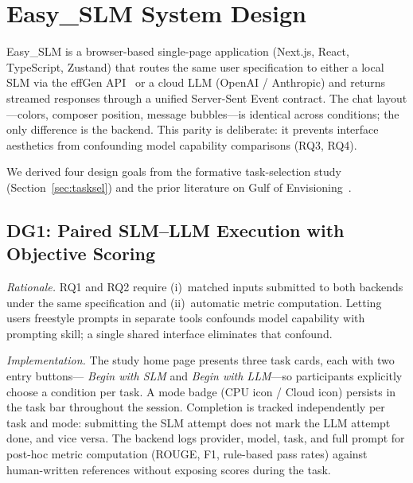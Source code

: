 \section{Easy\_SLM System Design}

Easy\_SLM is a browser-based single-page application (Next.js, React,
TypeScript, Zustand) that routes the same user specification to either a local
SLM via the effGen API~\cite{effgen} or a cloud LLM (OpenAI / Anthropic) and
returns streamed responses through a unified Server-Sent Event contract.
The chat layout---colors, composer position, message bubbles---is identical
across conditions; the only difference is the backend.
This parity is deliberate: it prevents interface aesthetics from confounding
model capability comparisons (RQ3, RQ4).

We derived four design goals from the formative task-selection study
(Section~\ref{sec:tasksel}) and the prior literature on Gulf of
Envisioning~\cite{subramonyam2024gulf, zamfirescu2023johnny}.

\subsection{DG1: Paired SLM--LLM Execution with Objective Scoring}

\textit{Rationale.}
RQ1 and RQ2 require (i)~matched inputs submitted to both backends under
the same specification and (ii)~automatic metric computation.
Letting users freestyle prompts in separate tools confounds model capability
with prompting skill; a single shared interface eliminates that confound.

\textit{Implementation.}
The study home page presents three task cards, each with two entry buttons---
\textit{Begin with SLM} and \textit{Begin with LLM}---so participants explicitly
choose a condition per task.
A mode badge (CPU icon / Cloud icon) persists in the task bar throughout the
session.
Completion is tracked independently per task and mode: submitting the SLM
attempt does not mark the LLM attempt done, and vice versa.
The backend logs provider, model, task, and full prompt for post-hoc metric
computation (ROUGE, F1, rule-based pass rates) against human-written
references without exposing scores during the task.

